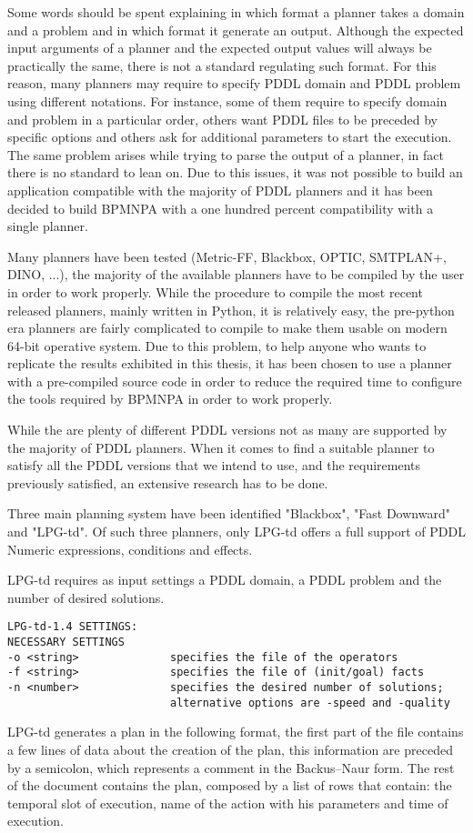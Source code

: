 Some words should be spent explaining in which format a planner takes a domain and a problem and in which format it generate an output. Although the expected input arguments of a planner and the expected output values will always be practically the same, there is not a standard regulating such format. 
For this reason, many planners may require to specify PDDL domain and PDDL problem using different notations. For instance, some of them require to specify domain and problem in a particular order, others want PDDL files to be preceded by specific options and others ask for additional parameters to start the execution. 
The same problem  arises while trying to parse the output of a planner, in fact there is no standard to lean on. 
Due to this issues, it was not possible to build an application compatible with the majority of PDDL planners and it has been decided to build BPMNPA with a one hundred percent compatibility with a single planner.

Many planners have been tested (Metric-FF, Blackbox, OPTIC, SMTPLAN+, DINO, ...), the majority of the available planners have to be compiled by the user in order to work properly. While the procedure to compile the most recent released planners, mainly written in Python, it is relatively easy, the pre-python era planners are fairly complicated to compile to make them usable on modern 64-bit operative system. Due to this problem, to help anyone who wants to replicate the results exhibited in this thesis, it has been chosen to use a planner with a pre-compiled source code in order to reduce the required time to configure the tools required by BPMNPA in order to work properly. 

While the are plenty of different PDDL versions not as many are supported by the majority of PDDL planners. When it comes to find a suitable planner to satisfy all the PDDL versions that we intend to use, and the requirements previously satisfied, an extensive research has to be done. 

Three main planning system have been identified "Blackbox", "Fast Downward" and "LPG-td". 
Of such three planners, only LPG-td offers a full support of PDDL Numeric expressions, conditions and effects\cite{lpg, fast-downward-planner, blackbox-planner}.

LPG-td requires as input settings a PDDL domain, a PDDL problem and the number of desired solutions.
\begin{lstlisting}[caption=Mandatory input parameters of LPG-td]
LPG-td-1.4 SETTINGS:
NECESSARY SETTINGS
-o <string>              specifies the file of the operators 
-f <string>              specifies the file of (init/goal) facts
-n <number>              specifies the desired number of solutions;
                         alternative options are -speed and -quality
\end{lstlisting}
LPG-td generates a plan in the following format, 
the first part of the file contains a few lines of data about the creation of the plan, this information are preceded by a  semicolon, which represents a comment in the Backus–Naur form\cite{backusnaur}. The rest of the document contains the plan, composed by a list of rows that contain: the temporal slot of execution, name of the action with his parameters and time of execution.

